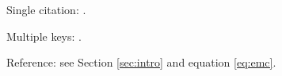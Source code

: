 Single citation: \cite{einstein}.

Multiple keys: \cite{dirac,bohr,planck}.

Reference: see Section \ref{sec:intro} and equation \eqref{eq:emc}.
